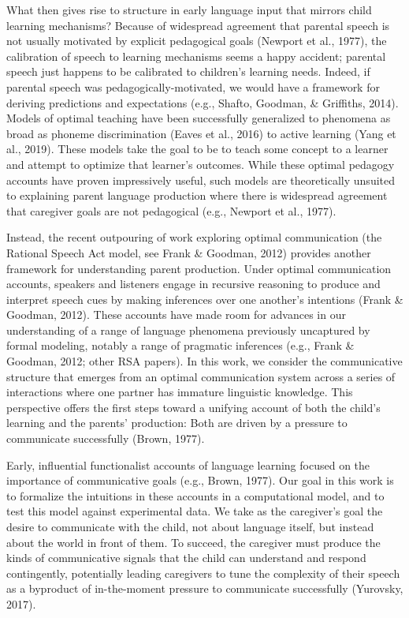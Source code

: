 \documentclass[english,,man,floatsintext]{apa6}
\begin{document}
What then gives rise to structure in early language input that mirrors child learning mechanisms? Because of widespread agreement that parental speech is not usually motivated by explicit pedagogical goals (Newport et al., 1977), the calibration of speech to learning mechanisms seems a happy accident; parental speech just happens to be calibrated to children's learning needs. Indeed, if parental speech was pedagogically-motivated, we would have a framework for deriving predictions and expectations (e.g., Shafto, Goodman, \& Griffiths, 2014). Models of optimal teaching have been successfully generalized to phenomena as broad as phoneme discrimination (Eaves et al., 2016) to active learning (Yang et al., 2019). These models take the goal to be to teach some concept to a learner and attempt to optimize that learner's outcomes. While these optimal pedagogy accounts have proven impressively useful, such models are theoretically unsuited to explaining parent language production where there is widespread agreement that caregiver goals are not pedagogical (e.g., Newport et al., 1977).

Instead, the recent outpouring of work exploring optimal communication (the Rational Speech Act model, see Frank \& Goodman, 2012) provides another framework for understanding parent production. Under optimal communication accounts, speakers and listeners engage in recursive reasoning to produce and interpret speech cues by making inferences over one another's intentions (Frank \& Goodman, 2012). These accounts have made room for advances in our understanding of a range of language phenomena previously uncaptured by formal modeling, notably a range of pragmatic inferences (e.g., Frank \& Goodman, 2012; other RSA papers). In this work, we consider the communicative structure that emerges from an optimal communication system across a series of interactions where one partner has immature linguistic knowledge. This perspective offers the first steps toward a unifying account of both the child's learning and the parents' production: Both are driven by a pressure to communicate successfully (Brown, 1977).

Early, influential functionalist accounts of language learning focused on the importance of communicative goals (e.g., Brown, 1977). Our goal in this work is to formalize the intuitions in these accounts in a computational model, and to test this model against experimental data. We take as the caregiver's goal the desire to communicate with the child, not about language itself, but instead about the world in front of them. To succeed, the caregiver must produce the kinds of communicative signals that the child can understand and respond contingently, potentially leading caregivers to tune the complexity of their speech as a byproduct of in-the-moment pressure to communicate successfully (Yurovsky, 2017).
\end{document}
